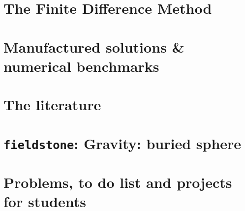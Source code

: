 \documentclass[a4paper]{article}
\numberwithin{equation}{section}
\begin{document}
\newpage
\section{The Finite Difference Method} %


\newpage
\section{Manufactured solutions \& numerical benchmarks} %


\newpage
\section{The literature} %
 \label{app:topics}









\newpage %
\section{{\tt fieldstone}: Gravity: buried sphere} %

\newpage %
\section{Problems, to do list and projects for students} %
\end{document}

